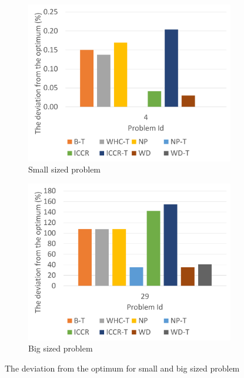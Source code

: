 \begin{figure}
	\centering
	\begin{subfigure}{0.45\textwidth}
		\includegraphics[width=\textwidth]{images/EnergyDeviationSmallProblem.pdf}
		\caption{Small sized problem}
		\label{fig:SmallProblemEnergy}
	\end{subfigure}
	\hfill
	\begin{subfigure}{0.45\textwidth}
		\includegraphics[width=\textwidth]{images/EnergyDeviationMediumProblem.pdf}
		\caption{Big sized problem}
		\label{fig:MediumProblemEnergy}
	\end{subfigure}    
	\caption[The deviation from the optimum for small and big sized problem]{The deviation from the optimum for small and big sized problem}
	\label{fig:SmallMediumProblemEnergy}    
\end{figure}



